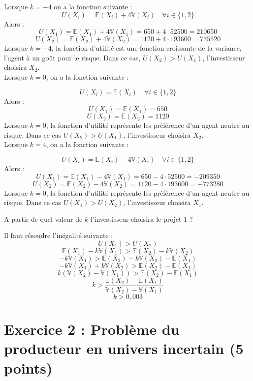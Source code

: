 \documentclass[12pt, a4paper]{exam}
\begin{document}
\begin{solutionbox}{16cm}
Lorsque \( k=-4 \) on a la fonction suivante : 
\[ 
U(X_i)=\mathbb{E}(X_i)+4\mathbb{V}(X_i)\quad \forall i \in \{1,2\}
 \]
Alors : 
\[ 
U(X_1)=\mathbb{E}(X_1)+4\mathbb{V}(X_1)=650+4\cdot52500=210650
\]
\[ 
U(X_2)=\mathbb{E}(X_2)+4\mathbb{V}(X_2)=1120+4\cdot193600=775520
\]
Lorsque \( k=-4 \), la fonction d'utilité est une fonction croissante de la variance, l'agent à un goût pour le risque. Dans ce cas, \( U(X_2)>U(X_1) \), l'investisseur choisira \( X_2 \).\\

Lorsque \( k=0 \), on a la fonction suivante : 

\[ 
U(X_i)=\mathbb{E}(X_i)\quad \forall i \in \{1,2\}
\]
Alors : 
\[ 
U(X_1)=\mathbb{E}(X_1)=650
\]
\[ 
U(X_2)=\mathbb{E}(X_2)=1120
\]
Lorsque \( k=0 \), la fonction d'utilité représente les préférence d'un agent neutre au risque. Dans ce cas \( U(X_2)>U(X_1) \), l'investisseur choisira \( X_2 \).\\

Lorsque \( k=4 \), on a la fonction suivante : 

\[ 
U(X_i)=\mathbb{E}(X_i)-4\mathbb{V}(X_i)\quad \forall i \in \{1,2\}
\]
Alors : 
\[ 
U(X_1)=\mathbb{E}(X_1)-4\mathbb{V}(X_1)=650-4\cdot52500=-209350
\]
\[ 
U(X_2)=\mathbb{E}(X_2)-4\mathbb{V}(X_2)=1120-4\cdot193600=-773280
\]
Lorsque \( k=0 \), la fonction d'utilité représente les préférence d'un agent neutre au risque. Dans ce cas \( U(X_1)>U(X_2) \), l'investisseur choisira \( X_1 \).
\end{solutionbox}
\begin{questions}
	\question[1,25] A partir de quel valeur de \( k \) l'investisseur choisira le projet 1 ?
\end{questions}

\begin{solutionbox}{8cm}
Il faut résoudre l'inégalité suivante :
\[ 
U(X_1)>U(X_2)
\]
\[ 
\mathbb{E}(X_1)-k\mathbb{V}(X_1)>\mathbb{E}(X_2)-k\mathbb{V}(X_2)
\]
\[ 
 -k\mathbb{V}(X_1)>\mathbb{E}(X_2)-k\mathbb{V}(X_2)-\mathbb{E}(X_1)
\]
\[ 
 -k\mathbb{V}(X_1)+k\mathbb{V}(X_2)>\mathbb{E}(X_2)-\mathbb{E}(X_1)
\]
\[ 
k\left(\mathbb{V}(X_2)-\mathbb{V}(X_1)\right) > \mathbb{E}(X_2)-\mathbb{E}(X_1)
 \]
 \[ 
 k>\frac{\mathbb{E}(X_2)-\mathbb{E}(X_1)}{\mathbb{V}(X_2)-\mathbb{V}(X_1)}
  \]
  \[ 
  k>0,003
   \]
\end{solutionbox}
\section*{Exercice 2 : Problème du producteur en univers incertain (5 points)}

\label{LastPage}
\end{document}
